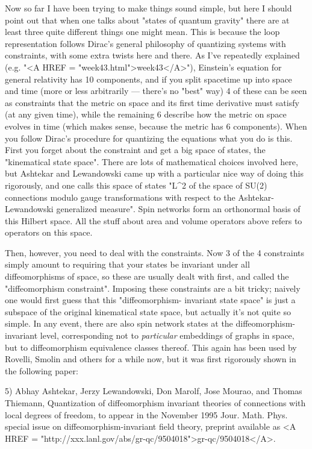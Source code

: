Now so far I have been trying to make things sound simple, but here I 
should point out that when one talks about "states of quantum gravity" 
there are at least three quite different things one might mean.  This is 
because the loop representation follows Dirac's general philosophy of 
quantizing systems with constraints, with some extra twists here and there.  
As I've repeatedly explained (e.g. "<A HREF = "week43.html">week43</A>"), Einstein's equation for 
general relativity has 10 components, and if you split spacetime up into 
space and time (more or less arbitrarily --- there's no "best" way) 4 of 
these can be seen as constraints that the metric on space and its first time 
derivative must satisfy (at any given time), while the remaining 6 describe 
how the metric on space evolves in time (which makes sense, because the 
metric has 6 components).  When you follow Dirac's procedure for quantizing
the equations what you do is this.  First you forget about the constraint
and get a big space of states, the "kinematical state space".  There are lots
of mathematical choices involved here, but Ashtekar and Lewandowski
came up with a particular nice way of doing this rigorously, and one calls this
space of states "L^2 of the space of SU(2) connections modulo gauge
transformations with respect to the Ashtekar-Lewandowski generalized 
measure".  Spin networks form an orthonormal basis of this Hilbert space.  
All the stuff about area and volume operators above refers to operators on this 
space.

Then, however, you need to deal with the constraints.  Now
3 of the 4 constraints simply amount to requiring that your states be invariant
under all diffeomorphisms of space, so these are usually dealt with first,
and called the "diffeomorphism constraint".  Imposing these constraints
are a bit tricky; naively one would first guess that this "diffeomorphism-
invariant state space" is just a subspace of the original kinematical state
space, but actually it's not quite so simple.  In any event, there are also
spin network states at the diffeomorphism-invariant level, corresponding
not to \emph{particular} embeddings of graphs in space, but to diffeomorphism
equivalence classes thereof.  This again has been used by Rovelli, Smolin and
others for a while now, but it was first rigorously shown in the following 
paper:

5) Abhay Ashtekar, Jerzy Lewandowski, Don Marolf, Jose Mourao, and 
Thomas Thiemann, Quantization of diffeomorphism invariant theories of 
connections with local degrees of freedom, to appear in the November 1995 
Jour. Math. Phys. special issue on diffeomorphism-invariant field theory, 
preprint available as <A HREF = "http://xxx.lanl.gov/abs/gr-qc/9504018">gr-qc/9504018</A>.

